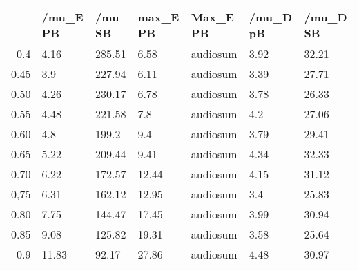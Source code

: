 \begin{table}[ht]
\centering
\begin{tabular}{rllllll}
  \hline
 & /mu\_E PB & /mu SB & max\_E PB & Max\_E PB & /mu\_D pB & /mu\_D SB \\ 
  \hline
0.4 & 4.16 & 285.51 & 6.58 & audiosum & 3.92 & 32.21 \\ 
  0.45 & 3.9 & 227.94 & 6.11 & audiosum & 3.39 & 27.71 \\ 
  0.50 & 4.26 & 230.17 & 6.78 & audiosum & 3.78 & 26.33 \\ 
  0.55 & 4.48 & 221.58 & 7.8 & audiosum & 4.2 & 27.06 \\ 
  0.60 & 4.8 & 199.2 & 9.4 & audiosum & 3.79 & 29.41 \\ 
  0.65 & 5.22 & 209.44 & 9.41 & audiosum & 4.34 & 32.33 \\ 
  0.70 & 6.22 & 172.57 & 12.44 & audiosum & 4.15 & 31.12 \\ 
  0,75 & 6.31 & 162.12 & 12.95 & audiosum & 3.4 & 25.83 \\ 
  0.80 & 7.75 & 144.47 & 17.45 & audiosum & 3.99 & 30.94 \\ 
  0.85 & 9.08 & 125.82 & 19.31 & audiosum & 3.58 & 25.64 \\ 
  0.9 & 11.83 & 92.17 & 27.86 & audiosum & 4.48 & 30.97 \\ 
   \hline
\end{tabular}
\end{table}
